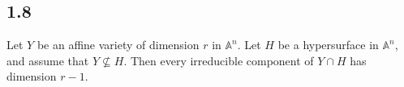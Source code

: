     \subsection*{1.8}
    Let $Y$ be an affine variety of dimension $r$ in $\mathbb{A}^n$.  Let $H$ be a hypersurface in $\mathbb{A}^n$, and assume that $Y \not\subseteq H$.  Then every irreducible component of $Y \cap H$ has dimension $r-1$.


